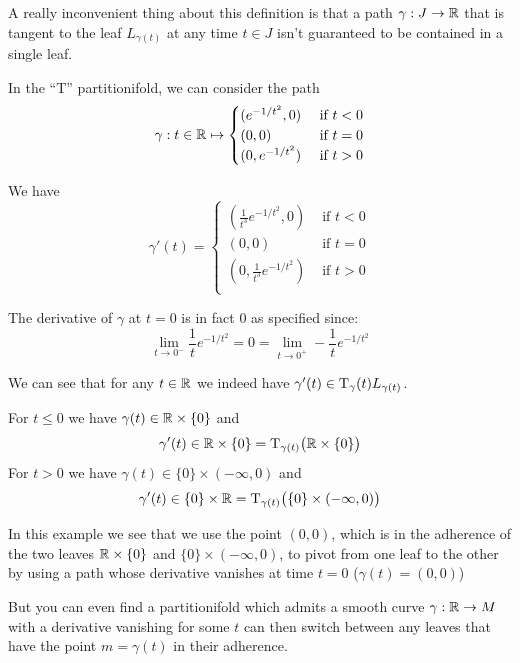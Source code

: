 	A really inconvenient thing about this definition is that a path $\gamma : J \to \mathbb{R}$ that is tangent to the leaf $L_{\gamma(t)}$ at any time $t \in J$ isn't guaranteed to be contained in a single leaf.

	\begin{example}
		In the ``T'' partitionifold, we can consider the path
		$$
			\gamma: t \in \mathbb{R} \mapsto
			\begin{cases}
				(e^{-1/t^2}, 0)  &\text{ if } t < 0 \\
				(0, 0)           &\text{ if } t = 0 \\
				(0, e^{-1/t^2})  &\text{ if } t > 0 \\
			\end{cases}
		$$

		We have
		$$
			\gamma'(t) =
			\begin{cases}
				(\frac{1}{t^3} e^{-1/t^2}, 0)  &\text{ if } t < 0 \\
				(0, 0)                         &\text{ if } t = 0 \\
				(0, \frac{1}{t^3} e^{-1/t^2})  &\text{ if } t > 0 \\
			\end{cases}
		$$
		
		The derivative of $\gamma$ at $t=0$ is in fact $0$ as specified since:
		$$
			\lim_{t \to 0^-} \frac{1}{t} e^{-1/t^2} = 0 = \lim_{t \to 0^+} -\frac{1}{t} e^{-1/t^2}
		$$

		We can see that for any $t \in \mathbb{R}$ we indeed have $\gamma'(t) \in \mathrm{T}_\gamma(t) L_{\gamma(t)}$.
        
		For $t \leq 0$ we have $\gamma(t) \in \mathbb{R} \times \{0\}$ and
		$$
			\gamma'(t) \in \mathbb{R} \times \{0\} = \mathrm{T}_{\gamma(t)}\big( \mathbb{R} \times \{0\} \big)
		$$
		For $t > 0$ we have $\gamma(t) \in \{0\} \times (-\infty, 0)$ and
		$$
			\gamma'(t) \in \{0\} \times \mathbb{R} = \mathrm{T}_{\gamma(t)}\big( \{0\} \times (-\infty, 0) \big)
		$$
	\end{example}

	In this example we see that we use the point $(0,0)$, which is in the adherence of the two leaves $\mathbb{R} \times \{0\}$ and $\{0\} \times (-\infty, 0)$, to pivot from one leaf to the other by using a path whose derivative vanishes at time $t=0$ ($\gamma(t) = (0,0)$)

	But you can even find a partitionifold which admits a smooth curve $\gamma: \mathbb{R} \to M$ with a derivative vanishing for some $t$ can then switch between any leaves that have the point $m = \gamma(t)$ in their adherence.

